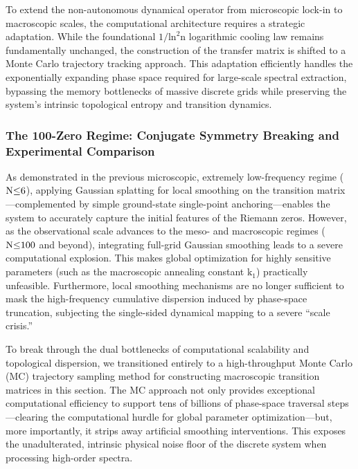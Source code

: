 \documentclass[fractalfract,article,submit,oneauthor,pdftex]{Definitions/mdpi}
\begin{document}
To extend the non-autonomous dynamical operator from microscopic lock-in
to macroscopic scales, the computational architecture requires a
strategic adaptation. While the foundational
\(\text{1/}\text{ln}^{\text{2}}\text{n}\) logarithmic cooling law
remains fundamentally unchanged, the construction of the transfer matrix
is shifted to a Monte Carlo trajectory tracking approach. This
adaptation efficiently handles the exponentially expanding phase space
required for large-scale spectral extraction, bypassing the memory
bottlenecks of massive discrete grids while preserving the system's
intrinsic topological entropy and transition dynamics.

\subsubsection{The 100-Zero Regime: Conjugate Symmetry Breaking and Experimental Comparison}

As demonstrated in the previous microscopic, extremely low-frequency
regime (\(\text{N}\text{\ensuremath{\le}6}\)), applying Gaussian splatting for local
smoothing on the transition matrix---complemented by simple ground-state
single-point anchoring---enables the system to accurately capture the
initial features of the Riemann zeros. However, as the observational
scale advances to the meso- and macroscopic regimes
(\(\text{N}\text{\ensuremath{\le}100}\) and beyond), integrating full-grid Gaussian
smoothing leads to a severe computational explosion. This makes
global optimization for highly sensitive parameters (such as the
macroscopic annealing constant \(\text{k}_{\text{1}}\)) practically
unfeasible. Furthermore, local smoothing mechanisms are no longer
sufficient to mask the high-frequency cumulative dispersion induced by
phase-space truncation, subjecting the single-sided dynamical mapping to
a severe ``scale crisis.''

To break through the dual bottlenecks of computational scalability and
topological dispersion, we transitioned entirely to a high-throughput
Monte Carlo (MC) trajectory sampling method for constructing macroscopic
transition matrices in this section. The MC approach not only provides
exceptional computational efficiency to support tens of billions of
phase-space traversal steps---clearing the computational hurdle for
global parameter optimization---but, more importantly, it strips away
artificial smoothing interventions. This exposes the unadulterated,
intrinsic physical noise floor of the discrete system when processing
high-order spectra.
\end{document}
